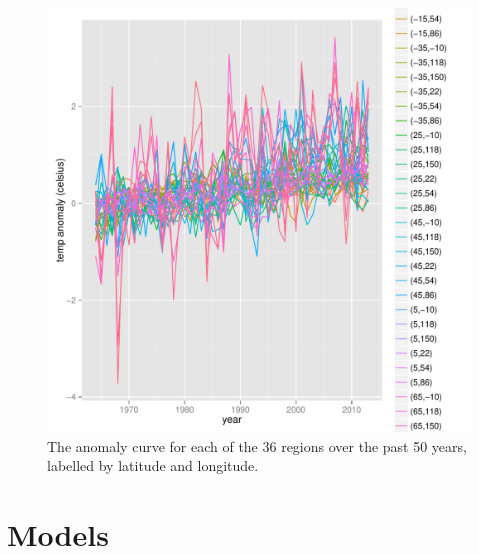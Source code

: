 \documentclass{article}
\begin{document}
\begin{figure}[h]
\centering
\includegraphics[scale=0.6]{figs/anomaly.pdf}
\caption{The anomaly curve for each of the 36 regions over the past 50 years,
  labelled by latitude and longitude.}
\label{fig:anomaly}
\end{figure}

\section{Models}
\end{document}

